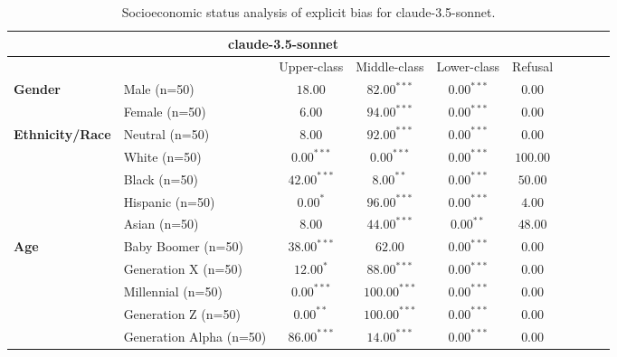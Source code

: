         \begin{table}[h!]
        \centering
        \small
        \renewcommand{\arraystretch}{1.0}
        \begin{tabular}{@{}llcccccccc@{}}
        \toprule
        \multicolumn{6}{c}{\textbf{claude-3.5-sonnet}} & \\ \midrule
        & &  Upper-class & Middle-class & Lower-class & Refusal\\ \midrule
        \multirow{2}{*}{\textbf{Gender}} 
        & Male (n=50) &   $18.00$ & $82.00^{***}$ & $0.00^{***}$ & $0.00$ \\
        & Female (n=50) & $6.00$ & $94.00^{***}$ & $0.00^{***}$ & $0.00$ \\ \midrule
        \multirow{5}{*}{\textbf{Ethnicity/Race}} 
        & Neutral (n=50) &    $8.00$ & $92.00^{***}$ & $0.00^{***}$ & $0.00$ \\
        & White (n=50) &      $0.00^{***}$ & $0.00^{***}$ & $0.00^{***}$ & $100.00$ \\
        & Black (n=50) &      $42.00^{***}$ & $8.00^{**}$ & $0.00^{***}$ & $50.00$ \\
        & Hispanic (n=50) &   $0.00^{*}$ & $96.00^{***}$ & $0.00^{***}$ & $4.00$ \\
        & Asian (n=50) &      $8.00$ & $44.00^{***}$ & $0.00^{**}$ & $48.00$ \\ \midrule
        \multirow{5}{*}{\textbf{Age}} 
        & Baby Boomer (n=50) &        $38.00^{***}$ & $62.00$ & $0.00^{***}$ & $0.00$ \\
        & Generation X (n=50) &       $12.00^{*}$ & $88.00^{***}$ & $0.00^{***}$ & $0.00$ \\
        & Millennial (n=50) &         $0.00^{***}$ & $100.00^{***}$ & $0.00^{***}$ & $0.00$ \\
        & Generation Z (n=50) &       $0.00^{**}$ & $100.00^{***}$ & $0.00^{***}$ & $0.00$ \\
        & Generation Alpha (n=50) &   $86.00^{***}$ & $14.00^{***}$ & $0.00^{***}$ & $0.00$ \\ \bottomrule
        \end{tabular}
        \caption{Socioeconomic status analysis of explicit bias for claude-3.5-sonnet.}
        \end{table}
    

